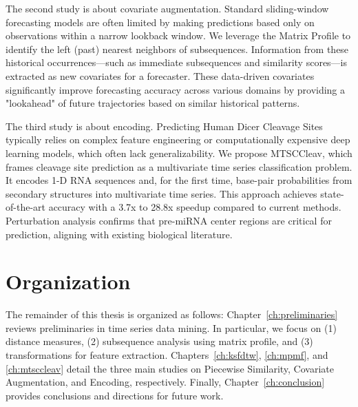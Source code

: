The second study is about covariate augmentation.
%
Standard sliding-window forecasting models are often limited by making predictions based only on observations within a narrow lookback window.
%
We leverage the Matrix Profile to identify the left (past) nearest neighbors of subsequences. Information from these historical occurrences—such as immediate subsequences and similarity scores—is extracted as new covariates for a forecaster.
%
These data-driven covariates significantly improve forecasting accuracy across various domains by providing a "lookahead" of future trajectories based on similar historical patterns.

The third study is about encoding.
%
Predicting Human Dicer Cleavage Sites typically relies on complex feature engineering or computationally expensive deep learning models, which often lack generalizability.
%
We propose MTSCCleav, which frames cleavage site prediction as a multivariate time series classification problem. It encodes 1-D RNA sequences and, for the first time, base-pair probabilities from secondary structures into multivariate time series.
%
This approach achieves state-of-the-art accuracy with a 3.7x to 28.8x speedup compared to current methods. Perturbation analysis confirms that pre-miRNA center regions are critical for prediction, aligning with existing biological literature.

\section{Organization}

The remainder of this thesis is organized as follows:
Chapter~\ref{ch:preliminaries} reviews preliminaries in time series data mining.
In particular, we focus on (1) distance measures, (2) subsequence analysis using matrix profile, and (3) transformations for feature extraction.
Chapters~\ref{ch:ksfdtw}, \ref{ch:mpmf}, and \ref{ch:mtsccleav} detail the three main studies on Piecewise Similarity, Covariate Augmentation, and Encoding, respectively. 
Finally, Chapter~\ref{ch:conclusion} provides conclusions and directions for future work.

